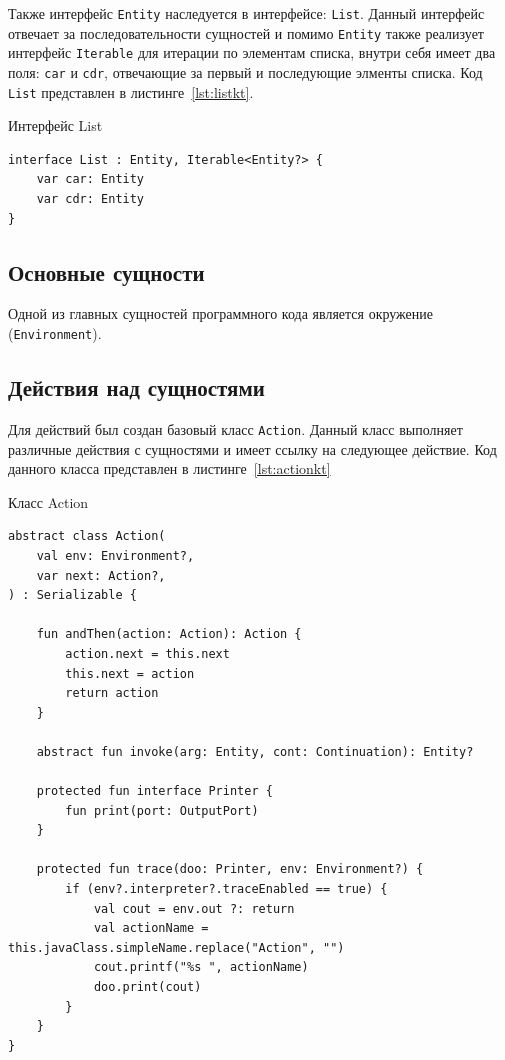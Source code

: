 \documentclass[14pt, russian]{scrartcl}
\begin{document}
Также интерфейс \texttt{Entity} наследуется в интерфейсе: \texttt{List}.
Данный интерфейс отвечает за последовательности сущностей и помимо \texttt{Entity} также реализует интерфейс \texttt{Iterable} для итерации по элементам списка, внутри себя имеет два поля: \texttt{car} и \texttt{cdr}, отвечающие за первый и последующие элменты списка.
Код \texttt{List} представлен в листинге~\ref{lst:listkt}.

\begin{listing}[!htb]
\caption{Интерфейс List}
\label{lst:listkt}
\begin{verbatim}
interface List : Entity, Iterable<Entity?> {
    var car: Entity
    var cdr: Entity
}
\end{verbatim}
\end{listing}

\subsection{Основные сущности}

Одной из главных сущностей программного кода является окружение (\texttt{Environment}). 

\subsection{Действия над сущностями}

Для действий был создан базовый класс \texttt{Action}.
Данный класс выполняет различные действия с сущностями и имеет ссылку на следующее действие.
Код данного класса представлен в листинге~\ref{lst:actionkt}

\begin{listing}[!htb]
\caption{Класс Action}
\label{lst:actionkt}
\begin{verbatim}
abstract class Action(
    val env: Environment?,
    var next: Action?,
) : Serializable {

    fun andThen(action: Action): Action {
        action.next = this.next
        this.next = action
        return action
    }

    abstract fun invoke(arg: Entity, cont: Continuation): Entity?

    protected fun interface Printer {
        fun print(port: OutputPort)
    }

    protected fun trace(doo: Printer, env: Environment?) {
        if (env?.interpreter?.traceEnabled == true) {
            val cout = env.out ?: return
            val actionName = this.javaClass.simpleName.replace("Action", "")
            cout.printf("%s ", actionName)
            doo.print(cout)
        }
    }
}

\end{verbatim}
\end{listing}
\end{document}
